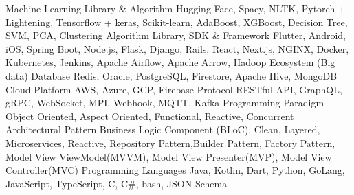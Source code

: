 
\horizontalLineRight

\skillItem
    {Machine Learning Library \& Algorithm}
    {Hugging Face, Spacy, NLTK, Pytorch + Lightening, Tensorflow + keras, Scikit-learn, AdaBoost, XGBoost, Decision Tree, SVM, PCA, Clustering Algorithm}
\skillItem
    {Library, SDK \& Framework}
    {Flutter, Android, iOS, Spring Boot, Node.js, Flask,
        Django, Rails,
        React, Next.js, NGINX, Docker, Kubernetes,
        Jenkins, Apache Airflow, Apache Arrow, Hadoop Ecosystem (Big data)}
\skillItem
    {Database}
    {Redis, Oracle, PostgreSQL, Firestore, Apache Hive, MongoDB}
\skillItem
    {Cloud Platform}
    {AWS, Azure, GCP, Firebase}
\skillItem
    {Protocol}
    {RESTful API, GraphQL, gRPC, WebSocket, MPI, Webhook, MQTT, Kafka}
\skillItem
    {Programming Paradigm}
    {Object Oriented, Aspect Oriented, Functional, Reactive, Concurrent}
\skillItem
    {Architectural Pattern}
    {Business Logic Component (BLoC), Clean, Layered, Microservices, Reactive, Repository Pattern,Builder Pattern,
        Factory Pattern, Model View ViewModel(MVVM), Model View Presenter(MVP), Model View Controller(MVC)}
\skillItem
    {Programming Languages}
    {Java, Kotlin, Dart, Python, GoLang, JavaScript, TypeScript, C, C\#, bash, JSON Schema}